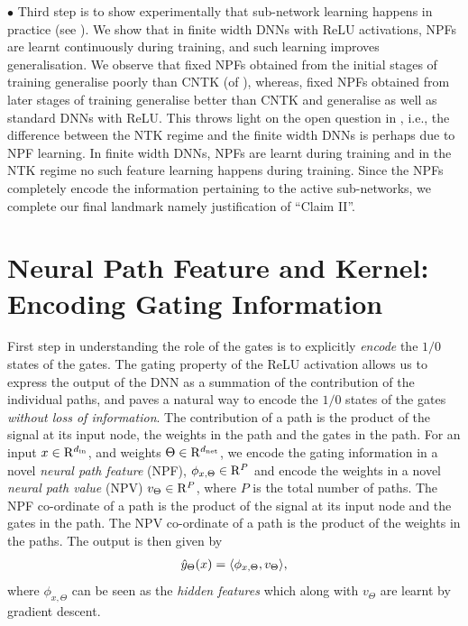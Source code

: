\documentclass{article}
\begin{document}
$\bullet$ Third step is to show experimentally that sub-network learning happens in practice (see ). We show that in finite width DNNs with ReLU activations, NPFs are learnt continuously during training, and such learning improves generalisation. We observe that fixed NPFs obtained from the initial stages of training generalise poorly than CNTK (of \cite{arora2019exact}), whereas, fixed NPFs obtained from later stages of training generalise better than CNTK and generalise as well as standard DNNs with ReLU. This throws light on the open question in , i.e., the difference between the NTK regime and the finite width DNNs is perhaps due to NPF learning. In finite width DNNs, NPFs are learnt during training and in the NTK regime no such feature learning happens during training. Since the NPFs completely encode the information pertaining to the active sub-networks, we complete our final landmark namely  justification of ``Claim II''. 

\section{Neural Path Feature and Kernel: Encoding Gating Information}\label{sec:path}
First step in understanding the role of the gates is to explicitly \emph{encode} the $1/0$ states of the gates. The gating property of the ReLU activation allows us to express the output of the DNN as a summation of the contribution of the individual paths, and paves a natural way to encode the $1/0$ states of the gates \emph{without loss of information}. The contribution of a path is the product of the signal at its input node, the weights in the path and the gates in the path. For an input $x\in\mathrm{R}^{d_{\text{in}}}$, and weights $\Theta\in\mathrm{R}^{d_{\text{net}}}$, 
we encode the gating information in a novel \emph{neural path feature} (NPF), $\phi_{x,\Theta}\in\mathrm{R}^P$ and encode the weights in a novel \emph{neural path value} (NPV) $v_{\Theta}\in\mathrm{R}^P$, where $P$ is the total number of paths. 
The NPF co-ordinate of a path is the product of the signal at its input node and the gates in the path. The NPV co-ordinate of a path is the product of the weights in the paths. The output is then given by
\begin{align}\label{eq:npfnpv}
\hat{y}_{\Theta}(x)=\langle \phi_{x,\Theta}, v_{\Theta}\rangle,
\end{align}
where $\phi_{x,\Theta}$ can be seen as the \emph{hidden features} which along with $v_{\Theta}$ are learnt by gradient descent.  
\end{document}
